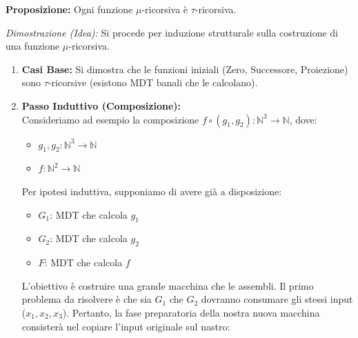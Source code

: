 \textbf{Proposizione:} Ogni funzione $\mu$-ricorsiva è $\tau$-ricorsiva.

\vspace{0.2cm}
\textit{Dimostrazione (Idea):} Si procede per induzione strutturale sulla costruzione di una funzione $\mu$-ricorsiva.

\begin{enumerate}
    \item \textbf{Casi Base:} Si dimostra che le funzioni iniziali (Zero, Successore, Proiezione) sono $\tau$-ricorsive (esistono MDT banali che le calcolano).
    
    \vspace{0.2cm}
    \item \textbf{Passo Induttivo (Composizione):} \\
    Consideriamo ad esempio la composizione $f \circ (g_1, g_2) : \mathbb{N}^3 \to \mathbb{N}$, dove:
    \begin{itemize}
        \item $g_1, g_2 : \mathbb{N}^3 \to \mathbb{N}$
        \item $f : \mathbb{N}^2 \to \mathbb{N}$
    \end{itemize}
    Per ipotesi induttiva, supponiamo di avere già a disposizione:
    \begin{itemize}
        \item $G_1$: MDT che calcola $g_1$
        \item $G_2$: MDT che calcola $g_2$
        \item $F$: MDT che calcola $f$
    \end{itemize}
    
    L'obiettivo è costruire una grande macchina che le assembli. Il primo problema da risolvere è che sia $G_1$ che $G_2$ dovranno consumare gli stessi input ($x_1, x_2, x_3$). Pertanto, la fase preparatoria della nostra nuova macchina consisterà nel copiare l'input originale sul nastro:

    \vspace{0.4cm}
    \begin{center}
\end{center}
\end{enumerate}
